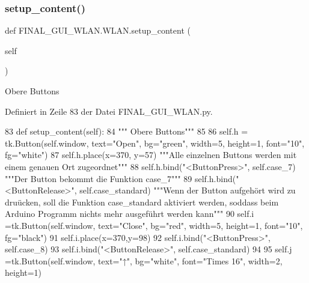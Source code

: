\subsubsection{\texorpdfstring{setup\+\_\+content()}{setup\_content()}}
{\footnotesize\ttfamily def F\+I\+N\+A\+L\+\_\+\+G\+U\+I\+\_\+\+W\+L\+A\+N.\+W\+L\+A\+N.\+setup\+\_\+content (\begin{DoxyParamCaption}\item[{}]{self }\end{DoxyParamCaption})}

\begin{DoxyVerb}Obere Buttons\end{DoxyVerb}
 

Definiert in Zeile 83 der Datei F\+I\+N\+A\+L\+\_\+\+G\+U\+I\+\_\+\+W\+L\+A\+N.\+py.


\begin{DoxyCode}
83     \textcolor{keyword}{def }setup\_content(self):
84 \textcolor{stringliteral}{""" Obere Buttons"""}
85         
86         self.h = tk.Button(self.window, text=\textcolor{stringliteral}{"Open"}, bg=\textcolor{stringliteral}{"green"}, width=5, height=1, font=\textcolor{stringliteral}{"10"}, fg=\textcolor{stringliteral}{"white"})
87         self.h.place(x=370, y=57)                                                                          
          \textcolor{stringliteral}{"""Alle einzelnen Buttons werden mit einem genauen Ort zugeordnet"""}
88         self.h.bind(\textcolor{stringliteral}{"<ButtonPress>"}, self.case\_7)                                                          
          \textcolor{stringliteral}{"""Der Button bekommt die Funktion case\_7"""}
89         self.h.bind(\textcolor{stringliteral}{"<ButtonRelease>"}, self.case\_standard)                                                 
          \textcolor{stringliteral}{"""Wenn der Button aufgehört wird zu druücken, soll die Funktion case\_standard aktiviert werden, soddass
       beim Arduino Programm nichts mehr ausgeführt werden kann"""}
90         self.i =tk.Button(self.window, text=\textcolor{stringliteral}{"Close"}, bg=\textcolor{stringliteral}{"red"}, width=5, height=1, font=\textcolor{stringliteral}{"10"}, fg=\textcolor{stringliteral}{"black"})
91         self.i.place(x=370,y=98) 
92         self.i.bind(\textcolor{stringliteral}{"<ButtonPress>"}, self.case\_8)
93         self.i.bind(\textcolor{stringliteral}{"<ButtonRelease>"}, self.case\_standard)
94 
95         self.j =tk.Button(self.window, text=\textcolor{stringliteral}{"↑"}, bg=\textcolor{stringliteral}{"white"}, font=\textcolor{stringliteral}{"Times 16"}, width=2, height=1)

\end{DoxyCode}
